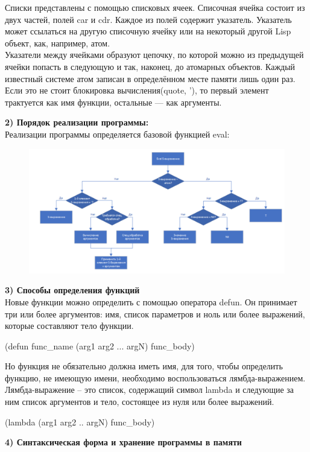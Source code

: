 \documentclass[a4paper, 12pt]{article}
\begin{document}
\hspace*{-6mm}Списки представлены с помощью списковых ячеек. Списочная ячейка состоит из двух частей, полей car и cdr. Каждое из полей содержит указатель. Указатель может ссылаться на другую списочную ячейку или на некоторый другой Lisp объект, как, например, атом.
\\ Указатели между ячейками образуют цепочку, по которой можно из предыдущей ячейки попасть в следующую и так, наконец, до атомарных объектов. Каждый известный системе атом записан в определённом месте памяти лишь один раз.
\\Если это  не стоит блокировка вычисления(quote, '), то первый элемент трактуется как имя функции, остальные — как аргументы.

\hspace*{-13mm} \textbf{2) Порядок реализации программы:}
\\ Реализации программы определяется базовой функцией eval:
\clearpage
\newpage
\begin{figure}[h!]
	\centering \includegraphics[scale=0.7]{eval}
\end{figure}
\hspace*{-8mm} \textbf{3) Способы определения функций}
\\Новые функции можно определить с помощью оператора defun. Он принимает три или более аргументов: имя, список параметров и ноль или более выражений, которые составляют тело функции. 

(defun func\_name (arg1 arg2 ... argN) func\_body)

Но функция не обязательно должна иметь имя, для того, чтобы определить функцию, не имеющую имени, необходимо воспользоваться лямбда-выражением. Лямбда-выражение – это список, содержащий символ lambda и следующие за ним список аргументов и тело, состоящее из нуля или более выражений.

(lambda (arg1 arg2 .. argN) func\_body)

\hspace*{-8mm} \textbf{4) Синтаксическая форма и хранение программы в памяти}
\\
\end{document}

